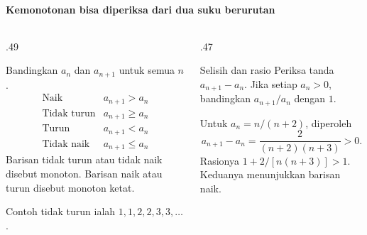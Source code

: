 \documentclass{../../kalkulus-ppt}
\begin{document}
\begin{frame}{\insertsection}
    \framesubtitle{Kemonotonan bisa diperiksa dari dua suku berurutan}
    \begin{columns}[T,onlytextwidth]
        \begin{column}{.49\textwidth}
            \begin{definisi}
                Bandingkan $a_n$ dan $a_{n+1}$ untuk semua $n$.
                \[
                    \begin{array}{l|l}
                        \text{Naik} & a_{n+1}>a_n\\
                        \text{Tidak turun} & a_{n+1}\ge a_n\\
                        \text{Turun} & a_{n+1}<a_n\\
                        \text{Tidak naik} & a_{n+1}\le a_n
                    \end{array}
                \]
                Barisan tidak turun atau tidak naik disebut monoton.
                Barisan naik atau turun disebut monoton ketat.
            \end{definisi}
            Contoh tidak turun ialah $1,1,2,2,3,3,\ldots$.
        \end{column}
        \begin{column}{.47\textwidth}
            \begin{block}{Selisih dan rasio}
                Periksa tanda $a_{n+1}-a_n$. Jika setiap
                $a_n>0$, bandingkan $a_{n+1}/a_n$ dengan $1$.
            \end{block}
            \begin{contoh}
                Untuk $a_n=n/(n+2)$, diperoleh
                \[
                    a_{n+1}-a_n=\frac{2}{(n+2)(n+3)}>0.
                \]
                Rasionya $1+2/[n(n+3)]>1$.
                Keduanya menunjukkan barisan naik.
            \end{contoh}
        \end{column}
    \end{columns}
\end{frame}
\end{document}
